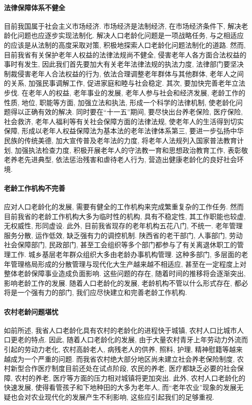 \documentclass[a4paper, 12pt, UTF8]{article}
\begin{document}
\paragraph{法律保障体系不健全}
目前我国属于社会主义市场经济. 市场经济是法制经济, 在市场经济条件下, 解决老龄化问题也应逐步实现法制化. 解决人口老龄化问题是一项战略任务, 与之相适应的应该是从法制的高度采取对策, 积极地探索人口老龄化问题法制化的道路. 然而, 目前我省有关保护老年人权益的法律法规尚不健全, 侵害老年人各方面合法权益的事时有发生, 因此我们首先要加大有关老年法律法规的执法力度, 法律部门要坚决制裁侵害老年人合法权益的行为, 依法合理调整老年群体与其他群体, 老年人之间的关系, 加强民事调解工作, 促进家庭和睦与社会稳定. 其次, 要加快完善老年立法步伐. 在老年人的权益, 老年事业的发展, 老年人参与社会和经济发展, 老龄工作的性质, 地位, 职能等方面, 加强立法和执法, 形成一个科学的法律机制, 使老龄化问题得以正确有效的解决. 同时要在“十一五”期间, 要尽快出台养老保险, 医疗保险, 社会救济, 老年人福利等有关社会保障方面的法律法规, 使老年人的生活得到切实保障, 形成以老年人权益保障法为基本法的老年法律体系第三, 要进一步弘扬中华民族的传统美德, 加大宣传普及老年法的力度, 将老年人法规列入国家普法教育计划, 加强执法检查力度, 积极开展老年人的守法教一育和思想政治教育工作, 表彰敬老养老先进典型, 依法惩治残害和虐待老人行为, 营造出健康老龄化的良好社会环境. 

\paragraph{老龄工作机构不完善}
应对人口老龄化的发展, 需要有健全的工作机构来完成繁重复杂的工作任务. 然而目前我省的老龄工作机构大多为临时性的机构, 具有不稳定性, 其工作职能也较虚, 无权威性, 形同虚设. 此外, 目前我省现存的老年机构五花八门, 不统一. 老年管理服务分散, 运作低效, 缺乏强有力的调控机制. 陕西省的老干部门, 人事部门, 劳动社会保障部门, 民政部门, 甚至工会组织等多个部门都参与了有关离退休职工的管理工作. 城乡基层老年群众组织大多由老龄办事机构管理. 这种多部门, 多层面的老年管理格局形成的分散管理与现代化大生产越来越不相适应, 甚至在一定程度上对整体老龄保障事业造成负面影响. 这些问题的存在, 随着时间的推移将会逐渐突出, 影响老龄工作的发展. 随着人口老龄化的发展, 老龄机构不管以什么形式存在, 都必将是一个强有力的部门, 我们应尽快建立和完善老龄工作机构. 

\paragraph{农村老龄问题堪忧}
如前所述, 我省人口老龄化具有农村的老龄化的进程快于城镇, 农村人口比城市人口更老的特点. 因此, 随着人口老龄化的发展, 由于大量农村青牙上年劳动力外流而引起的劳动力老化, 农村高龄老人, 病残老人的供养, 照料, 护理, 精神慰籍等越来越成为一个严重的问题. 而我省农村绝大部分地区尚未建立社会养老保险制度, 农村新型合作医疗制度目前还处在试点阶段, 农民的养老, 医疗都缺乏必要的社会保障, 农村的养老, 医疗等方面的压力相对城镇将更加突出. 此外, 农村人口老龄化的快速发展, 使得看管孩子和下地种田的大多为老年人, 而“老年农业”现象的发展无疑也会对农业现代化的发展产生不利影响, 这些应引起我们的足够重视. 
\end{document}
